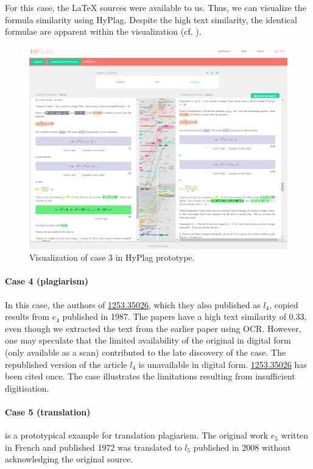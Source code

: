 \documentclass{llncs}
\newcommand{\zbl}[1]{\href{https://zbmath.org/?q=an:#1}{\textsf{#1}}}
\begin{document}
For this case, the LaTeX sources were available to us. Thus, we can visualize the formula similarity using HyPlag. Despite the high text similarity, the identical formulae are apparent within the visualization (cf. ).
\begin{figure}[tb]
\includegraphics[width=\textwidth]{case3.png}
\caption{Visualization of case 3 in HyPlag prototype.}\label{fg.case3}
\end{figure}
\paragraph{Case 4 (plagiarism)} In this case, the authors of \zbl{1253.35026}, which they also published as $l_4$, copied results from $e_4$ published in 1987. The papers have a high text similarity of 0.33, even though we extracted the text from the earlier paper using OCR. However, one may speculate that the limited availability of the original in digital form (only available as a scan) contributed to the late discovery of the case. The republished version of the article $l_4$ is unavailable in digital form. \zbl{1253.35026} has been cited once. The case illustrates the limitations resulting from insufficient  digitisation.

\paragraph{Case 5 (translation)} is a prototypical example for translation plagiarism. The original work $e_5$ written in French and published 1972 was translated to $l_5$ published in 2008 without acknowledging the original source.
\end{document}
